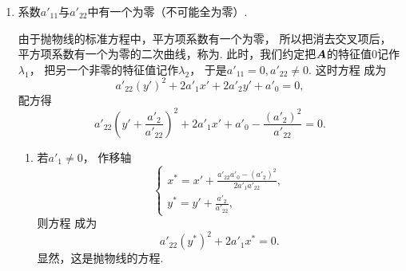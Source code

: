 \begin{enumerate}
	\item 系数\(a'_{11}\)与\(a'_{22}\)中有一个为零（不可能全为零）.

	由于抛物线的标准方程中，平方项系数有一个为零，
	所以把消去交叉项后，平方项系数有一个为零的二次曲线，称为.
	此时，我们约定把\(\boldsymbol{A}\)的特征值\(0\)记作\(\lambda_1\)，
	把另一个非零的特征值记作\(\lambda_2\)，
	于是\(
		a'_{11} = 0,
		a'_{22} \neq 0
	\).
	这时方程  成为\begin{equation*}
		a'_{22} (y')^2 + 2 a'_1 x' + 2 a'_2 y' + a'_0 = 0,
	\end{equation*}
	配方得\begin{equation}\label{equation:二次曲线方程的化简及其类型.配方后所得方程}
		a'_{22} \left( y' + \frac{a'_2}{a'_{22}} \right)^2
		+ 2 a'_1 x'
		+ a'_0 - \frac{(a'_2)^2}{a'_{22}} = 0.
	\end{equation}
	\begin{enumerate}
		\item 若\(a'_1 \neq 0\)，
		作移轴\begin{equation*}
			\left\{ \begin{array}{l}
				x^* = x' + \frac{a'_{22} a'_0 - (a'_2)^2}{2 a'_1 a'_{22}}, \\
				y^* = y' + \frac{a'_2}{a'_{22}},
			\end{array} \right.
		\end{equation*}
		则方程 
		成为\begin{equation}\label{equation:二次曲线方程的化简及其类型.抛物线的标准方程}
			a'_{22} (y^*)^2 + 2 a'_1 x^* = 0.
		\end{equation}
		显然，这是抛物线的方程.


\end{enumerate}
\end{enumerate}
